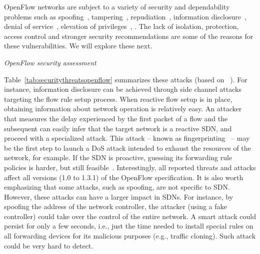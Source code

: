 OpenFlow networks are subject to a variety of security and dependability problems such as spoofing~\cite{kloti2013}, tampering~\cite{kloti2013}, 
repudiation~\cite{kloti2013}, information disclosure~\cite{kloti2013}, denial of service~\cite{kloti2013,shin2013,benton2013}, elevation of privileges~\cite{kloti2013}, .
The lack of isolation, protection, access control and stronger security recommendations are some of the reasons for these vulnerabilities.
We will explore these next.


\vspace{2mm}
\noindent \textit{OpenFlow security assessment}

Table~\ref{tab:securitythreatsopenflow} summarizes these attacks (based on ~\cite{kloti2013}). 
For instance, information disclosure can be achieved through side channel attacks targeting the flow rule setup process. 
When reactive flow setup is in place, obtaining information about network operation is relatively easy.
An attacker that measures the delay experienced by the first packet of a flow and the subsequent can easily infer that the target network is a reactive SDN, and proceed with a specialized attack. 
This attack -- known as fingerprinting~\cite{shin2013} -- may be the first step to launch a DoS attack intended to exhaust the resources of the network, for example. 
If the SDN is proactive, guessing its forwarding rule policies is harder, but still feasible~\cite{kloti2013}. 
Interestingly, all reported threats and attacks affect all versions (1.0 to 1.3.1) of the OpenFlow specification. 
It is also worth emphasizing that some attacks, such as spoofing, are not specific to SDN. 
However, these attacks can have a larger impact in SDNs. 
For instance, by spoofing the address of the network controller, the attacker (using a fake controller) could  take over the control of the entire network. 
A smart attack could persist for only a few seconds, i.e., just the time needed to install special rules on all forwarding devices for its malicious purposes (e.g., traffic cloning). 
Such attack could be very hard to detect.

